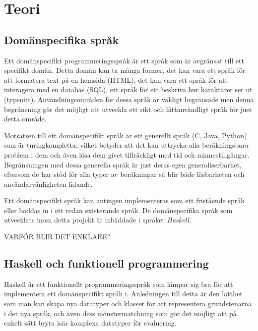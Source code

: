 
\chapter{Teori}

\section{Domänspecifika språk}
\begin{draft}
  Ett domänspecifikt programmeringsspråk är ett språk som är avgränsat till ett
  specifikt domän. Detta domän kan ta många former, det kan vara ett språk för
  att formatera text på en hemsida (HTML), det kan vara ett språk för att
  interagera med en databas (SQL), ett språk för ett beskriva hur karaktärer ser
  ut (typsnitt). Användningsområden för dessa språk är väldigt begränsade men
  denna begränsning gör det möjligt att utveckla ett rikt och lättanvändligt
  språk för just detta område. 

  \vskip 10pt

  Motsatsen till ett domänspecifikt språk är ett generellt språk (C, Java,
  Python) som är turingkompletta, vilket betyder att det kan uttrycka alla
  beräkningsbara problem i dem och även lösa dem givet tillräckligt med tid och
  minnestillgångar. Begränsningen med dessa generella språk är just deras egen
  generaliserbarhet, eftersom de har stöd för alla typer av beräkningar så blir
  både läsbarheten och användarvänligheten lidande.

  \vskip 10pt
  
  Ett domänspecifikt språk kan antingen implementeras som ett fristående språk
  eller bäddas in i ett redan existerande språk. De domänspecifika språk som
  utvecklats inom detta projekt är inbäddade i språket \textit{Haskell}.
\end{draft}

\begin{binge}
VARFÖR BLIR DET ENKLARE? 
\end{binge}

\section{Haskell och funktionell programmering}

\begin{draft}
  Haskell är ett funktionellt programmeringsspråk som lämpar sig bra för att
  implementera ett domänspecifikt språk i. Anledningen till detta är den lätthet
  som man kan skapa nya datatyper och klasser för att representera grundstenarna
  i det nya språk, och även dess mönstermatchning som gör det möjligt att på
  enkelt sätt bryta isär komplexa datatyper för evaluering.
\end{draft}

